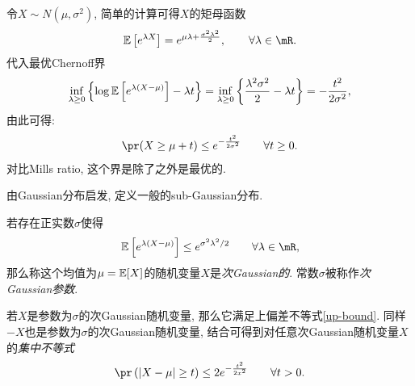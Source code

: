   \begin{exm}[Gaussian分布尾部界]
   令$X \sim N\left(\mu, \sigma^{2}\right)$, 简单的计算可得$X$的矩母函数
	\begin{align*}
	  \E\left[e^{\lambda X}\right]=e^{\mu \lambda+\frac{\sigma^{2} \lambda^{2}}{2}}, \qquad \forall\lambda \in \mR.
	\end{align*}
代入最优Chernoff界
	\begin{align*}
	  \inf _{\lambda \geq 0}\left\{\log \mathbb{E}\left[e^{\lambda(X-\mu)}\right]-\lambda t\right\}=\inf _{\lambda \geq 0}\left\{\frac{\lambda^{2} \sigma^{2}}{2}-\lambda t\right\}=-\frac{t^{2}}{2 \sigma^{2}},
	\end{align*}
由此可得:
	\begin{align} \label{up-bound}
	  \pr(X \geq \mu+t) \leq e^{-\frac{t^{2}}{2 \sigma^{2}}} \qquad \forall t \geq 0.
	\end{align}
对比Mills ratio, 这个界是除了之外是最优的.
  \end{exm}
  
由Gaussian分布启发, 定义一般的sub-Gaussian分布.
\begin{defin}
	  若存在正实数$\sigma$使得
	  \begin{align}
		\E\left[e^{\lambda(X-\mu)}\right] \leq e^{\sigma^{2} \lambda^{2} / 2} \qquad \forall \lambda \in \mR,
	  \end{align}
	  那么称这个均值为$\mu=\mathbb{E}[X]$的随机变量$X$是\emph{次Gaussian的}. 常数$\sigma$被称作\emph{次Gaussian参数}.
	\end{defin}

若$X$是参数为$\sigma$的次Gaussian随机变量, 那么它满足上偏差不等式\eqref{up-bound}. 同样$-X$也是参数为$\sigma$的次Gaussian随机变量, 结合可得到对任意次Gaussian随机变量$X$
  的\emph{集中不等式}
  \begin{align*}
	\pr\left(|X-\mu| \geq t\right) \leq 2 e^{-\frac{t^{2}}{2 x^{2}}} \qquad \forall t >0.
  \end{align*}
  

